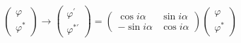 \begin{equation} \left(
\begin{array}{l}
 \varphi \\
 \varphi^*
\end{array} \right)\rightarrow
\left(\begin{array}{l}
 \varphi^\prime \\
 \varphi^{* \prime}
\end{array} \right) =\left(
\begin{array}{rr}
  \cos{i\alpha} & \sin{i\alpha}  \\
  -\sin{i\alpha} & \cos{i\alpha}
\end{array} \right)
\left(\begin{array}{l}
 \varphi \\
 \varphi^*
\end{array} \right)
\end{equation}

